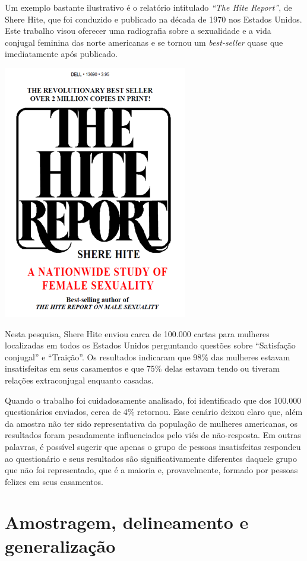 \documentclass[
]{book}
\begin{document}
Um exemplo bastante ilustrativo é o relatório intitulado \emph{``The Hite Report''}, de Shere Hite, que foi conduzido e publicado na década de 1970 nos Estados Unidos. Este trabalho visou oferecer uma radiografia sobre a sexualidade e a vida conjugal feminina das norte americanas e se tornou um \emph{best-seller} quase que imediatamente após publicado.

\includegraphics{./img/cap_importancia_amostragem.png}

Nesta pesquisa, Shere Hite enviou carca de 100.000 cartas para mulheres localizadas em todos os Estados Unidos perguntando questões sobre ``Satisfação conjugal'' e ``Traição''. Os resultados indicaram que 98\% das mulheres estavam insatisfeitas em seus casamentos e que 75\% delas estavam tendo ou tiveram relações extraconjugal enquanto casadas.

Quando o trabalho foi cuidadosamente analisado, foi identificado que dos 100.000 questionários enviados, cerca de 4\% retornou. Esse cenário deixou claro que, além da amostra não ter sido representativa da população de mulheres americanas, os resultados foram pesadamente influenciados pelo viés de não-resposta. Em outras palavras, é possível sugerir que apenas o grupo de pessoas insatisfeitas respondeu ao questionário e seus resultados são significativamente diferentes daquele grupo que não foi representado, que é a maioria e, provavelmente, formado por pessoas felizes em seus casamentos.

\hypertarget{amostragem-delineamento-e-generalizauxe7uxe3o}{%
\section{Amostragem, delineamento e generalização}\label{amostragem-delineamento-e-generalizauxe7uxe3o}}
\end{document}
